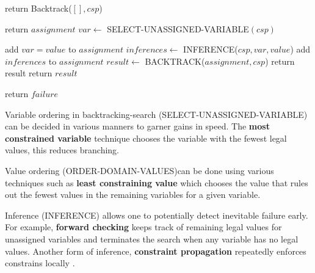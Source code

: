 \documentclass{article}
\begin{document}
\begin{algorithm}
\begin{algorithmic}

    \State return Backtrack($[],csp$)
\EndProcedure


    \State return $assignment$
\EndIf
\State $var \leftarrow$ SELECT-UNASSIGNED-VARIABLE$(csp)$

        \State add {$var = value$} to $assignment$
        \State $inferences \leftarrow$ INFERENCE($csp,var,value$)
            \State add $inferences$ to $assignment$
            \State $result \leftarrow $ BACKTRACK($assignment,csp$)
                        \State return result
                    \EndIf
                \EndIf
            \EndIf
    \State return $result$

\EndFor

\State return $failure$

\EndProcedure

\end{algorithmic}
\end{algorithm}

Variable ordering in backtracking-search (SELECT-UNASSIGNED-VARIABLE) can be decided in various manners to garner gains in speed. The \textbf{most constrained variable} technique chooses the variable with the fewest legal values, this reduces branching. \newline

Value ordering (ORDER-DOMAIN-VALUES)can be done using various techniques such as \textbf{least constraining value} which chooses the value that rules out the fewest values in the remaining variables for a given variable. \newline 

Inference (INFERENCE) allows one to potentially detect inevitable failure early. For example, \textbf{forward checking} keeps track of remaining legal values for unassigned variables and terminates the search when any variable has no legal values. Another form of inference, \textbf{constraint propagation} repeatedly enforces constrains locally . \newline 
\end{document}

